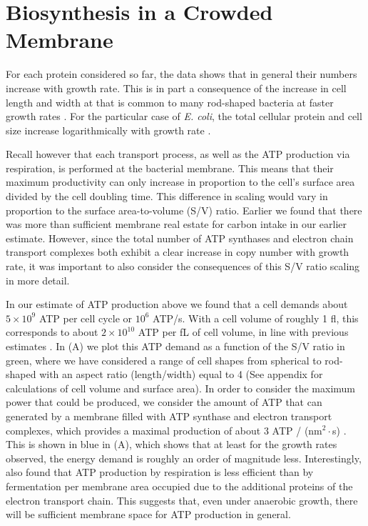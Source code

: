 \section{Biosynthesis in a Crowded Membrane}

For each protein considered so far, the data shows that in general their
numbers increase with growth rate. This is in part a consequence of the
increase in cell length and width at that is common to many rod-shaped
bacteria at faster growth rates \citep{ojkic2019, harris2018}. For the
particular case of \textit{E. coli}, the total cellular protein and cell size
increase logarithmically with growth rate \citep{schaechter1958, si2017}.

Recall however that each transport process, as well as the ATP production via
respiration, is performed at the bacterial membrane. This means that their
maximum productivity can only increase in proportion to the cell's surface
area divided by the cell doubling time. This difference in scaling would vary
in proportion to the surface area-to-volume (S/V) ratio. Earlier we found
that there was more than sufficient membrane real estate for carbon intake in
our earlier estimate. However, since the total number of ATP synthases and
electron chain transport complexes both exhibit a clear increase in copy
number with growth rate, it was important to also consider the consequences
of this S/V ratio scaling in more detail.

In our estimate of ATP production above we found that a cell demands about $5
\times 10^9$ ATP per cell cycle or $10^6$ ATP/s. With a cell volume of
roughly 1 fl, this corresponds to about $2 \times 10^{10}$ ATP per fL of cell
volume, in line with previous estimates \citep{stouthamer1977, szenk2017}. In
 (A) we plot this ATP demand as a function of the S/V
ratio in green, where we have considered a range of cell shapes from
spherical to rod-shaped with an aspect ratio (length/width) equal to 4 (See
appendix for calculations of cell volume and surface area). In order to
consider the maximum power that could be produced, we consider the amount of
ATP that can generated by a membrane filled with ATP synthase and electron
transport complexes, which provides a maximal production of about 3 ATP /
(nm$^2 \cdot$s) \citep{szenk2017}. This is shown in blue in
(A), which shows that at least for the growth rates
observed, the energy demand is roughly an order of magnitude less.
Interestingly, \cite{szenk2017} also found that ATP production by respiration
is less efficient than by fermentation per membrane area occupied due to the
additional proteins of the electron transport chain. This suggests that, even
under anaerobic growth, there will be sufficient membrane space for ATP
production in general.

